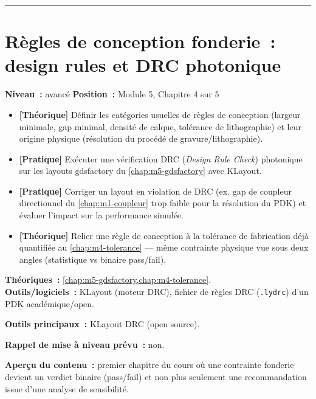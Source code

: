 \bigskip\hrule\bigskip

\chapter{Règles de conception fonderie~: design rules et DRC photonique}
\label{chap:m5-drc}

\noindent\textbf{Niveau~:} avancé \hfill \textbf{Position~:} Module 5, Chapitre 4 sur 5

\begin{objectifs}
\begin{itemize}[leftmargin=1.4em]
  \item \textbf{[Théorique]} Définir les catégories usuelles de règles de conception (largeur minimale, gap minimal, densité de calque, tolérance de lithographie) et leur origine physique (résolution du procédé de gravure/lithographie).
  \item \textbf{[Pratique]} Exécuter une vérification DRC (\emph{Design Rule Check}) photonique sur les layouts gdsfactory du \cref{chap:m5-gdsfactory} avec KLayout.
  \item \textbf{[Pratique]} Corriger un layout en violation de DRC (ex. gap de coupleur directionnel du \cref{chap:m1-coupleur} trop faible pour la résolution du PDK) et évaluer l'impact sur la performance simulée.
  \item \textbf{[Théorique]} Relier une règle de conception à la tolérance de fabrication déjà quantifiée au \cref{chap:m4-tolerance} — même contrainte physique vue sous deux angles (statistique vs binaire pass/fail).
\end{itemize}
\end{objectifs}

\begin{prerequis}
\textbf{Théoriques~:} \cref{chap:m5-gdsfactory,chap:m4-tolerance}.\\
\textbf{Outils/logiciels~:} KLayout (moteur DRC), fichier de règles DRC (\texttt{.lydrc}) d'un PDK académique/open.
\end{prerequis}

\noindent\textbf{Outils principaux~:} KLayout DRC (open source).

\noindent\textbf{Rappel de mise à niveau prévu~:} non.

\noindent\textbf{Aperçu du contenu~:} premier chapitre du cours où une contrainte fonderie devient un verdict binaire (pass/fail) et non plus seulement une recommandation issue d'une analyse de sensibilité.

